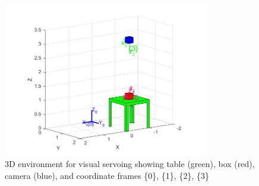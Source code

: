 \documentclass[11pt,a4paper]{article}
\begin{document}
\begin{figure}[H]
    \centering
    \includegraphics[width=0.8\textwidth]{figure_3.jpg}
    \caption{3D environment for visual servoing showing table (green), box (red), camera (blue), and coordinate frames \{0\}, \{1\}, \{2\}, \{3\}}
\end{figure}
\end{document}
